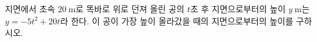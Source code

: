 지면에서 초속 $20\ \mathrm{m}$로 똑바로 위로 던져 올린 공의 $t$초 후 지면으로부터의 높이 $y\ \mathrm{m}$는 $y=-5t^2+20t$라 한다. 이 공이 가장 높이 올라갔을 때의 지면으로부터의 높이를 구하시오.

